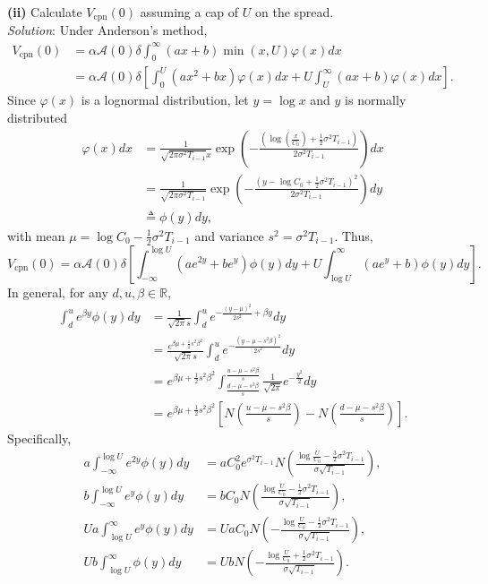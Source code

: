 \documentclass[paper=a4, fontsize=11pt]{scrartcl} %
\numberwithin{equation}{section} %
\numberwithin{figure}{section} %
\numberwithin{table}{section} %
\begin{document}
\textbf{(ii)} Calculate $V_{\text{cpn}}(0)$ assuming a cap of $U$ on the spread.\\
\textit{Solution}: Under Anderson's method,
\begin{align*}
V_{\text{cpn}}(0) &= \alpha \mathcal{A}(0)\delta \int_0^{\infty} (ax+b)\min(x,U)\varphi(x)dx\\
&= \alpha \mathcal{A}(0)\delta \left[ \int_0^{U} (ax^2+bx)\varphi(x)dx
+  U \int_U^{\infty} (ax+b)\varphi(x)dx \right].
\end{align*}
Since $\varphi(x)$ is a lognormal distribution, let $y=\log x$ and $y$ is normally distributed
\begin{align*}
\varphi(x)dx &= \frac{1}{\sqrt{2\pi \sigma^2 T_{i-1}}x} \exp\left(
-\frac{\left( \log\left(\frac{x}{C_0}\right) + \frac{1}{2}\sigma^2 T_{i-1} \right)}{2\sigma^2 T_{i-1}}
\right) dx\\
 &= \frac{1}{\sqrt{2\pi \sigma^2 T_{i-1}}} \exp\left(
-\frac{\left( y -\log C_0 + \frac{1}{2}\sigma^2 T_{i-1} \right)^2}{2\sigma^2 T_{i-1}}
\right) dy\\
&\triangleq \phi(y)dy,
\end{align*}
with mean $\mu = \log C_0 -  \frac{1}{2}\sigma^2 T_{i-1}$ and variance $s^2 = \sigma^2 T_{i-1}$. Thus,
$$
V_{\text{cpn}}(0)
 = \alpha \mathcal{A}(0)\delta \left[\int_{-\infty}^{\log U} (ae^{2y}+be^y)\phi(y)dy
+  U \int_{\log U}^{\infty} (ae^y +b)\phi(y)dy\right].
$$
In general, for any $d,u,\beta\in\mathbb{R}$,
\begin{align*}
\int_d^u e^{\beta y}\phi(y)dy &= \frac{1}{\sqrt{2\pi}s}\int_d^u e^{-\frac{(y-\mu)^2}{2s^2}+\beta y}dy \\
&= \frac{e^{ \beta \mu +\frac{1}{2}s^2\beta^2}}{\sqrt{2\pi}s}\int_d^u e^{-\frac{(y-\mu - s^2\beta)^2}{2s^2}}dy \\
&= e^{ \beta \mu +\frac{1}{2}s^2\beta^2} \int_{\frac{d-\mu -s^2\beta}{s}}^{\frac{u-\mu - s^2\beta}{s}} \frac{1}{\sqrt{2\pi}}e^{-\frac{y^2}{2}}dy \\
& = e^{ \beta \mu +\frac{1}{2}s^2\beta^2} \left[ N\left(\frac{u-\mu - s^2\beta}{s} \right) -  N\left(\frac{d-\mu - s^2\beta}{s}\right) \right].
\end{align*}
Specifically,
\begin{align*}
a\int_{-\infty}^{\log U} e^{2y}\phi(y)dy &=a C_0^2 e^{\sigma^2 T_{i-1}} N\left(\frac{\log\frac{U}{C_0}-  \frac{3}{2}\sigma^2 T_{i-1}}{\sigma\sqrt{T_{i-1}}} \right),\\
b\int_{-\infty}^{\log U} e^{y}\phi(y)dy &=b C_0 N\left(\frac{\log\frac{U}{C_0}-  \frac{1}{2}\sigma^2 T_{i-1}}{\sigma\sqrt{T_{i-1}}} \right),\\
Ua \int_{\log U}^{\infty} e^{y}\phi(y)dy &= Ua C_0N\left(-\frac{\log\frac{U}{C_0}-  \frac{1}{2}\sigma^2 T_{i-1}}{\sigma\sqrt{T_{i-1}}} \right),\\
Ub \int_{\log U}^{\infty} \phi(y)dy &= Ub N\left(-\frac{\log\frac{U}{C_0}+  \frac{1}{2}\sigma^2 T_{i-1}}{\sigma\sqrt{T_{i-1}}} \right).
\end{align*}
\end{document}
